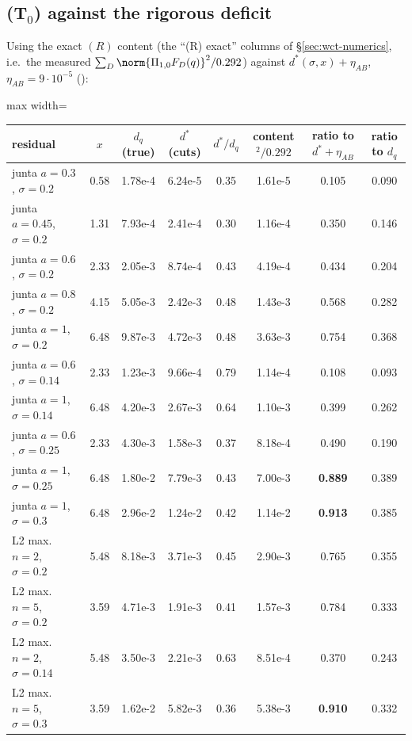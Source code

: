 \subsection{(T$_0$) against the rigorous deficit}\label{sec:ab-room}
Using the exact $(R)$ content (the ``(R) exact'' columns of \S\ref{sec:wct-numerics}, i.e.\ the measured $\sum_D\norm{\Pi_{1,0}F_D(q)}^2/0.292$) against $d^*(\sigma,x)+\eta_{AB}$,
$\eta_{AB}=9\cdot10^{-5}$ ():
\begin{center}\small
\begin{adjustbox}{max width=\linewidth}\begin{tabular}{lc|ccc|cc|c}\toprule
residual & $x$ & $d_q$ (true) & $d^*$ (cuts) & $d^*/d_q$ & content$^2/0.292$ & ratio to $d^*+\eta_{AB}$ & ratio to $d_q$\\\midrule
junta $a=0.3$, $\sigma=0.2$ & 0.58 & 1.78e-4 & 6.24e-5 & 0.35 & 1.61e-5 & 0.105 & 0.090\\
junta $a=0.45$, $\sigma=0.2$ & 1.31 & 7.93e-4 & 2.41e-4 & 0.30 & 1.16e-4 & 0.350 & 0.146\\
junta $a=0.6$, $\sigma=0.2$ & 2.33 & 2.05e-3 & 8.74e-4 & 0.43 & 4.19e-4 & 0.434 & 0.204\\
junta $a=0.8$, $\sigma=0.2$ & 4.15 & 5.05e-3 & 2.42e-3 & 0.48 & 1.43e-3 & 0.568 & 0.282\\
junta $a=1$, $\sigma=0.2$ & 6.48 & 9.87e-3 & 4.72e-3 & 0.48 & 3.63e-3 & 0.754 & 0.368\\
junta $a=0.6$, $\sigma=0.14$ & 2.33 & 1.23e-3 & 9.66e-4 & 0.79 & 1.14e-4 & 0.108 & 0.093\\
junta $a=1$, $\sigma=0.14$ & 6.48 & 4.20e-3 & 2.67e-3 & 0.64 & 1.10e-3 & 0.399 & 0.262\\
junta $a=0.6$, $\sigma=0.25$ & 2.33 & 4.30e-3 & 1.58e-3 & 0.37 & 8.18e-4 & 0.490 & 0.190\\
junta $a=1$, $\sigma=0.25$ & 6.48 & 1.80e-2 & 7.79e-3 & 0.43 & 7.00e-3 & \textbf{0.889} & 0.389\\
junta $a=1$, $\sigma=0.3$ & 6.48 & 2.96e-2 & 1.24e-2 & 0.42 & 1.14e-2 & \textbf{0.913} & 0.385\\
L2 max.\ $n=2$, $\sigma=0.2$ & 5.48 & 8.18e-3 & 3.71e-3 & 0.45 & 2.90e-3 & 0.765 & 0.355\\
L2 max.\ $n=5$, $\sigma=0.2$ & 3.59 & 4.71e-3 & 1.91e-3 & 0.41 & 1.57e-3 & 0.784 & 0.333\\
L2 max.\ $n=2$, $\sigma=0.14$ & 5.48 & 3.50e-3 & 2.21e-3 & 0.63 & 8.51e-4 & 0.370 & 0.243\\
L2 max.\ $n=5$, $\sigma=0.3$ & 3.59 & 1.62e-2 & 5.82e-3 & 0.36 & 5.38e-3 & \textbf{0.910} & 0.332\\\bottomrule
\end{tabular}\end{adjustbox}
\end{center}
